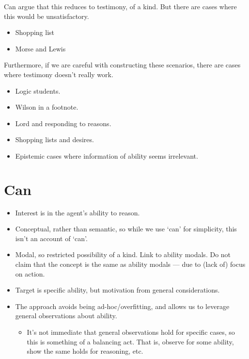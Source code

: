 \documentclass[10pt]{article}
\begin{document}
{
  \color{red}
  Can argue that this reduces to testimony, of a kind.
  But there are cases where this would be unsatisfactory.
  \begin{itemize}
  \item Shopping list
  \item Morse and Lewis
  \end{itemize}
  Furthermore, if we are careful with constructing these scenarios, there are cases where testimony doesn't really work.
  \begin{itemize}
  \item Logic students.
  \item Wilson in a footnote.
  \end{itemize}
}

\begin{itemize}
\item Lord and responding to reasons.
\item Shopping lists and desires.
\item Epistemic cases where information of ability seems irrelevant.
\end{itemize}



\section{Can}
\label{sec:can}

\begin{itemize}
\item Interest is in the agent's ability to reason.
\item Conceptual, rather than semantic, so while we use `can' for simplicity, this isn't an account of `can'.
\item Modal, so restricted possibility of a kind.
  Link to ability modals.
  Do not claim that the concept is the same as ability modals --- due to (lack of) focus on action.
\item Target is specific ability, but motivation from general considerations.
\item The approach avoids being ad-hoc/overfitting, and allows us to leverage general observations about ability.
  \begin{itemize}
  \item It's not immediate that general observations hold for specific cases, so this is something of a balancing act.
    That is, observe for some ability, show the same holds for reasoning, etc.\
  \end{itemize}
\end{itemize}
\end{document}
